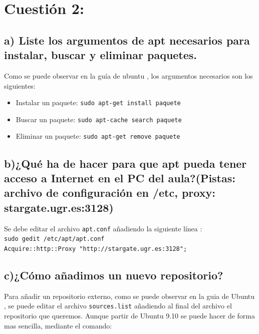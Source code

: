 
\section{Cuestión 2:}

\subsection{a) Liste los argumentos de apt necesarios para instalar, buscar y eliminar paquetes.}
Como se puede observar en la guía de ubuntu \cite{apt}, los argumentos necesarios son los siguientes:
\begin{itemize}
	\item Instalar un paquete: \texttt{sudo apt-get install paquete}
	\item Buscar un paquete: \texttt{sudo apt-cache search paquete}
	\item Eliminar un paquete: \texttt{sudo apt-get remove paquete}
\end{itemize}


\subsection{b)¿Qué ha de hacer para que apt pueda tener acceso a Internet en el PC del aula?(Pistas: archivo de configuración en /etc, proxy: stargate.ugr.es:3128)}

Se debe editar el archivo \texttt{apt.conf} añadiendo la siguiente línea \cite{aptProxy}: \\

\texttt{sudo gedit /etc/apt/apt.conf}\\
\texttt{Acquire::http::Proxy "http://stargate.ugr.es:3128";}

\subsection{c)¿Cómo añadimos un nuevo repositorio?}
Para añadir un repositorio externo, como se puede observar en la guia de Ubuntu \cite{aptRepository}, se puede editar el archivo \texttt{sources.list} añadiendo al final del archivo el repositorio que queremos. Aunque partir de Ubuntu 9.10 se puede hacer de forma mas sencilla, mediante el comando:\\

